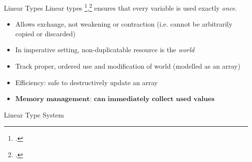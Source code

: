 \documentclass[aspectratio=169]{beamer}
\begin{document}
\begin{frame}{Linear Types}
    Linear types \footcite{girard_linear_1987},\footcite{wadler_linear_1990} ensures that every variable is used exactly \emph{once}.
    \begin{itemize}
        \item Allows exchange, not weakening or contraction (i.e. cannot be arbitrarily copied or discarded)
        \item In imperative setting, non-duplicatable resource is the \emph{world} %
        \item Track proper, ordered use and modification of world (modelled as an array)
        \item Efficiency: safe to destructively update an array
        \item $\textbf{Memory management: can immediately collect used values}$ %
    \end{itemize}
\end{frame}

\begin{frame}{Linear Type System}
\end{frame}
\end{document}
